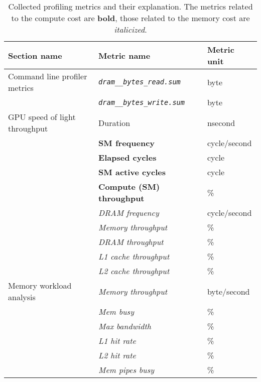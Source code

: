 \begin{table}[t]
  \begin{tabular}{lll}
    \toprule
    Section name                  & Metric name                                & Metric unit  \\
    \midrule\midrule
    Command line profiler metrics & \textit{\texttt{dram\_\_bytes\_read.sum}}  & byte         \\
                                  & \textit{\texttt{dram\_\_bytes\_write.sum}} & byte         \\
    GPU speed of light throughput & Duration                                   & nsecond      \\
                                  & \textbf{SM frequency}                      & cycle/second \\
                                  & \textbf{Elapsed cycles}                    & cycle        \\
                                  & \textbf{SM active cycles}                  & cycle        \\
                                  & \textbf{Compute (SM) throughput}           & \%           \\
                                  & \textit{DRAM frequency}                    & cycle/second \\
                                  & \textit{Memory throughput}                 & \%           \\
                                  & \textit{DRAM throughput}                   & \%           \\
                                  & \textit{L1 cache throughput}               & \%           \\
                                  & \textit{L2 cache throughput}               & \%           \\
    Memory workload analysis      & \textit{Memory throughput}                 & byte/second  \\
                                  & \textit{Mem busy}                          & \%           \\
                                  & \textit{Max bandwidth}                     & \%           \\
                                  & \textit{L1 hit rate}                       & \%           \\
                                  & \textit{L2 hit rate}                       & \%           \\
                                  & \textit{Mem pipes busy}                    & \%           \\
    \bottomrule
  \end{tabular}
  \caption[Collected profiling metrics and their explanation]{Collected profiling metrics and their explanation. The metrics related to the compute cost are \textbf{bold}, those related to the memory cost are \textit{italicized}.}
  \label{tab:4-profiling-metrics}
\end{table}

